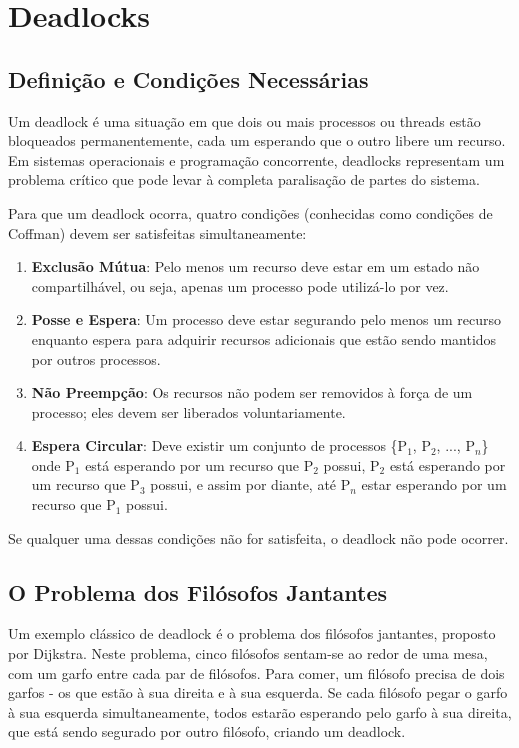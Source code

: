 \section{Deadlocks}\label{sec:deadlocks}

\subsection{Definição e Condições Necessárias}

Um deadlock é uma situação em que dois ou mais processos ou threads estão bloqueados permanentemente, cada um esperando que o outro libere um recurso. Em sistemas operacionais e programação concorrente, deadlocks representam um problema crítico que pode levar à completa paralisação de partes do sistema.

Para que um deadlock ocorra, quatro condições (conhecidas como condições de Coffman) devem ser satisfeitas simultaneamente:

\begin{enumerate}
    \item \textbf{Exclusão Mútua}: Pelo menos um recurso deve estar em um estado não compartilhável, ou seja, apenas um processo pode utilizá-lo por vez.

    \item \textbf{Posse e Espera}: Um processo deve estar segurando pelo menos um recurso enquanto espera para adquirir recursos adicionais que estão sendo mantidos por outros processos.

    \item \textbf{Não Preempção}: Os recursos não podem ser removidos à força de um processo; eles devem ser liberados voluntariamente.

    \item \textbf{Espera Circular}: Deve existir um conjunto de processos \{P$_1$, P$_2$, ..., P$_n$\} onde P$_1$ está esperando por um recurso que P$_2$ possui, P$_2$ está esperando por um recurso que P$_3$ possui, e assim por diante, até P$_n$ estar esperando por um recurso que P$_1$ possui.
\end{enumerate}

Se qualquer uma dessas condições não for satisfeita, o deadlock não pode ocorrer.

\subsection{O Problema dos Filósofos Jantantes}

Um exemplo clássico de deadlock é o problema dos filósofos jantantes, proposto por Dijkstra. Neste problema, cinco filósofos sentam-se ao redor de uma mesa, com um garfo entre cada par de filósofos. Para comer, um filósofo precisa de dois garfos - os que estão à sua direita e à sua esquerda. Se cada filósofo pegar o garfo à sua esquerda simultaneamente, todos estarão esperando pelo garfo à sua direita, que está sendo segurado por outro filósofo, criando um deadlock.

